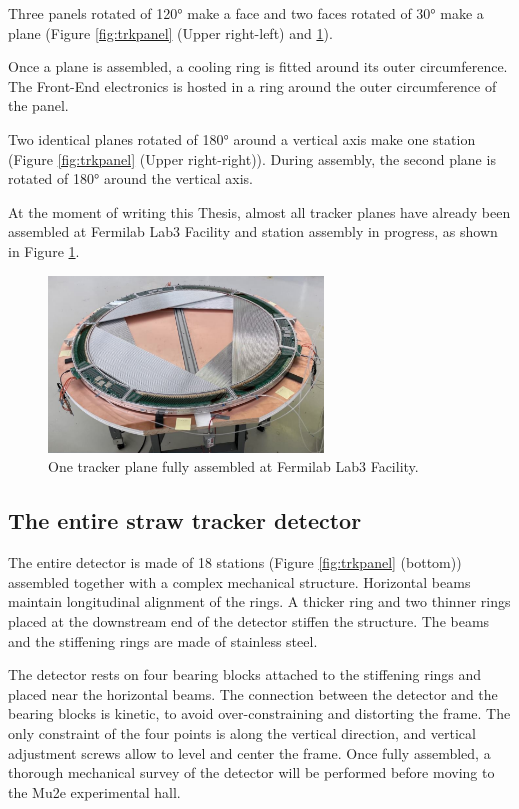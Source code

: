 Three panels rotated of 120° make a face and two faces rotated of 
30° make a plane (Figure \ref{fig:trkpanel} (Upper right-left) and \ref{fig:trueplane}).

Once a plane is assembled, a cooling ring is fitted around its outer circumference. 
The Front-End electronics is hosted in a ring around the outer 
circumference of the panel.

Two identical planes rotated of 180° around a vertical axis make one station 
(Figure \ref{fig:trkpanel} (Upper right-right)). 
During assembly, the second plane is rotated of 180° around the vertical axis.

At the moment of writing this Thesis, almost all  tracker planes have 
already been assembled at Fermilab Lab3 Facility and  station assembly  in progress, 
as shown in Figure \ref{fig:trueplane}.

\begin{figure}[!h]
    \centering
    \includegraphics[width =0.65\textwidth]{figures/png/Screenshot_20240706_163056.png}
    \caption[One tracker plane fully assembled.]{One tracker plane fully assembled at Fermilab Lab3 Facility.}
    \label{fig:trueplane}
\end{figure}
\subsection{The entire straw tracker detector}

The entire detector is made of 18 stations (Figure \ref{fig:trkpanel} 
(bottom)) assembled together with a complex mechanical structure. 
Horizontal beams maintain longitudinal alignment of the rings. 
A thicker ring and two thinner rings placed at the downstream end 
of the detector stiffen the structure. The beams and the stiffening rings 
are made of stainless steel.

The detector rests on four bearing blocks attached to the 
stiffening rings and placed near the horizontal beams.
The connection between the detector and the bearing blocks 
is kinetic, to avoid over-constraining and distorting the frame. 
The only constraint of the four points is along the vertical 
direction, and vertical adjustment screws allow to level and 
center the frame. Once fully assembled, a thorough mechanical 
survey of the detector will be performed before moving to the Mu2e experimental hall. 

